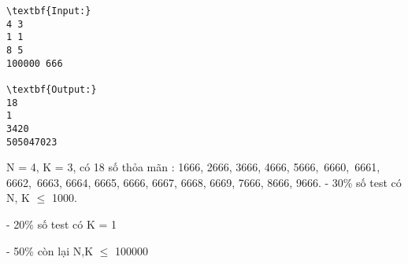 \begin{verbatim}
\textbf{Input:}
4 3
1 1
8 5
100000 666

\textbf{Output:}
18
1
3420
505047023
\end{verbatim}
N = 4, K = 3, có 18 số thỏa mãn : 1666, 2666, 3666, 4666, 5666, 6660, 6661, 6662, 6663, 6664, 6665, 6666, 6667, 6668, 6669, 7666, 8666, 9666.
- 30\% số test có N, K  $\le$  1000.

- 20\% số test có K = 1

- 50\% còn lại N,K  $\le$  100000